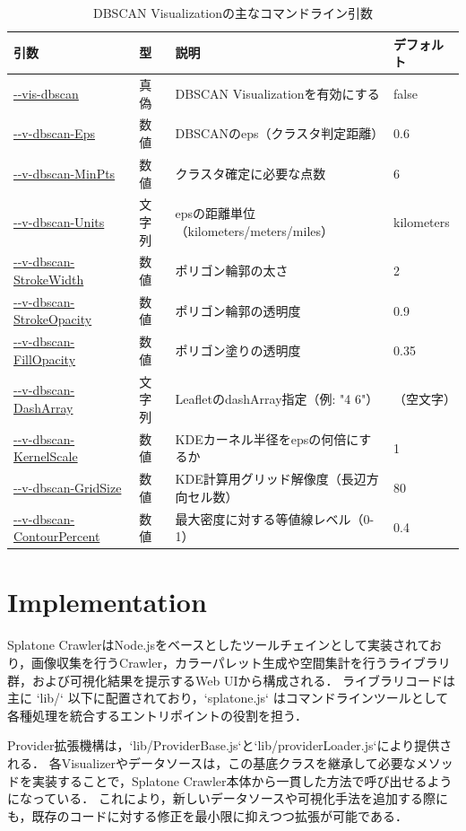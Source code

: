 \documentclass[11pt,a4paper]{jlreq}
\begin{document}
\begin{table}[h]
\centering\small
\setlength{\tabcolsep}{3pt}
\caption{DBSCAN Visualizationの主なコマンドライン引数}
\label{tab:dbscan_params}
\begin{tabularx}{\textwidth}{L{0.40\textwidth} L{0.09\textwidth} Y L{0.16\textwidth}}
\hline
引数 & 型 & 説明 & デフォルト \\
\hline
  \url{--vis-dbscan} & 真偽 & DBSCAN Visualizationを有効にする & false \\
  \url{--v-dbscan-Eps} & 数値 & DBSCANのeps（クラスタ判定距離） & 0.6 \\
  \url{--v-dbscan-MinPts} & 数値 & クラスタ確定に必要な点数 & 6 \\
  \url{--v-dbscan-Units} & 文字列 & epsの距離単位（kilometers/meters/miles） & kilometers \\
  \url{--v-dbscan-StrokeWidth} & 数値 & ポリゴン輪郭の太さ & 2 \\
  \url{--v-dbscan-StrokeOpacity} & 数値 & ポリゴン輪郭の透明度 & 0.9 \\
  \url{--v-dbscan-FillOpacity} & 数値 & ポリゴン塗りの透明度 & 0.35 \\
  \url{--v-dbscan-DashArray} & 文字列 & LeafletのdashArray指定（例: "4 6"） & （空文字） \\
  \url{--v-dbscan-KernelScale} & 数値 & KDEカーネル半径をepsの何倍にするか & 1 \\
  \url{--v-dbscan-GridSize} & 数値 & KDE計算用グリッド解像度（長辺方向セル数） & 80 \\
  \url{--v-dbscan-ContourPercent} & 数値 & 最大密度に対する等値線レベル（0-1） & 0.4 \\
\hline
\end{tabularx}
\end{table}


\section{Implementation}
\label{sec:implementation}
Splatone CrawlerはNode.jsをベースとしたツールチェインとして実装されており，画像収集を行うCrawler，カラーパレット生成や空間集計を行うライブラリ群，および可視化結果を提示するWeb UIから構成される．
ライブラリコードは主に `lib/` 以下に配置されており，`splatone.js` はコマンドラインツールとして各種処理を統合するエントリポイントの役割を担う．

Provider拡張機構は，`lib/ProviderBase.js`と`lib/providerLoader.js`により提供される．
各Visualizerやデータソースは，この基底クラスを継承して必要なメソッドを実装することで，Splatone Crawler本体から一貫した方法で呼び出せるようになっている．
これにより，新しいデータソースや可視化手法を追加する際にも，既存のコードに対する修正を最小限に抑えつつ拡張が可能である．
\end{document}
